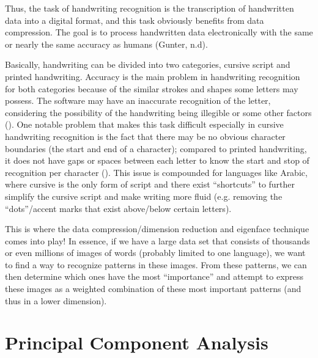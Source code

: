 \documentclass[12pt]{report}
\begin{document}
            Thus, the task of handwriting recognition is the transcription of handwritten data into a digital format, and this task obviously benefits from data compression. The goal is to process handwritten data electronically with the same or nearly the same accuracy as humans (Gunter, n.d).
            
            Basically, handwriting can be divided into two categories, cursive script and printed handwriting. Accuracy is the main problem in handwriting recognition for both categories because of the similar strokes and shapes some letters may possess. The software may have an inaccurate recognition of the letter, considering the possibility of the handwriting being illegible or some other factors (). One notable problem that makes this task difficult especially in cursive handwriting recognition is the fact that there may be no obvious character boundaries (the start and end of a character); compared to printed handwriting, it does not have gaps or spaces between each letter to know the start and stop of recognition per character (). This issue is compounded for languages like Arabic, where cursive is the only form of script and there exist ``shortcuts'' to further simplify the cursive script and make writing more fluid (e.g. removing the ``dots''/accent marks that exist above/below certain letters).
            
            This is where the data compression/dimension reduction and eigenface technique comes into play! In essence, if we have a large data set that consists of thousands or even millions of images of words (probably limited to one language), we want to find a way to recognize patterns in these images. From these patterns, we can then determine which ones have the most ``importance'' and attempt to express these images as a weighted combination of these most important patterns (and thus in a lower dimension).
        
    
    \chapter{Principal Component Analysis}
\end{document}
